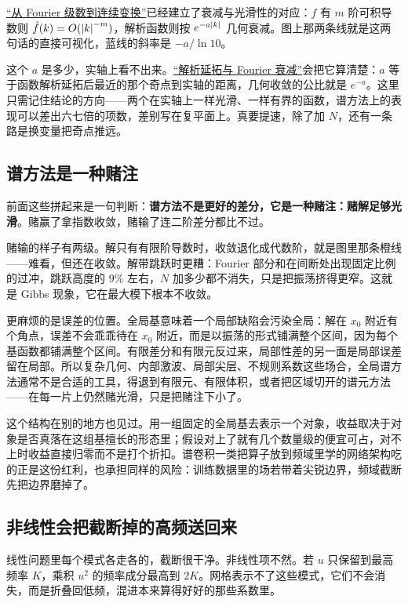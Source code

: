 \hyperref[sec:08-Numerical-Analysis/08-Fourier-and-Spectral-Methods/01]{``从 Fourier 级数到连续变换''}已经建立了衰减与光滑性的对应：\(f\) 有 \(m\) 阶可积导数则 \(\hat f(k)=O(\left|k\right|^{-m})\)，解析函数则按 \(e^{-a\left|k\right|}\) 几何衰减。图上那两条线就是这两句话的直接可视化，蓝线的斜率是 \(-a/\ln 10\)。

这个 \(a\) 是多少，实轴上看不出来。\hyperref[sec:08-Numerical-Analysis/09-Complex-Analysis-and-Residues/01]{``解析延拓与 Fourier 衰减''}会把它算清楚：\(a\) 等于函数解析延拓后最近的那个奇点到实轴的距离，几何收敛的公比就是 \(e^{-a}\)。这里只需记住结论的方向——两个在实轴上一样光滑、一样有界的函数，谱方法上的表现可以差出六七倍的项数，差别写在复平面上。真要提速，除了加 \(N\)，还有一条路是换变量把奇点推远。

\subsection{谱方法是一种赌注}

前面这些拼起来是一句判断：\textbf{谱方法不是更好的差分，它是一种赌注：赌解足够光滑}。赌赢了拿指数收敛，赌输了连二阶差分都比不过。

赌输的样子有两级。解只有有限阶导数时，收敛退化成代数阶，就是图里那条橙线——难看，但还在收敛。解带跳跃时更糟：Fourier 部分和在间断处出现固定比例的过冲，跳跃高度的 \(9\%\) 左右，\(N\) 加多少都不消失，只是把振荡挤得更窄。这就是 Gibbs 现象，它在最大模下根本不收敛。

更麻烦的是误差的位置。全局基意味着一个局部缺陷会污染全局：解在 \(x_0\) 附近有个角点，误差不会乖乖待在 \(x_0\) 附近，而是以振荡的形式铺满整个区间，因为每个基函数都铺满整个区间。有限差分和有限元反过来，局部性差的另一面是局部误差留在局部。所以复杂几何、内部激波、局部尖层、不规则系数这些场合，全局谱方法通常不是合适的工具，得退到有限元、有限体积，或者把区域切开的谱元方法——在每一片上仍然赌光滑，只是把赌注下小了。

这个结构在别的地方也见过。用一组固定的全局基去表示一个对象，收益取决于对象是否真落在这组基擅长的形态里；假设对上了就有几个数量级的便宜可占，对不上时收益直接归零而不是打个折扣。谱卷积一类把算子放到频域里学的网络架构吃的正是这份红利，也承担同样的风险：训练数据里的场若带着尖锐边界，频域截断先把边界磨掉了。

\subsection{非线性会把截断掉的高频送回来}

线性问题里每个模式各走各的，截断很干净。非线性项不然。若 \(u\) 只保留到最高频率 \(K\)，乘积 \(u^2\) 的频率成分最高到 \(2K\)。网格表示不了这些模式，它们不会消失，而是折叠回低频，混进本来算得好好的那些系数里。

